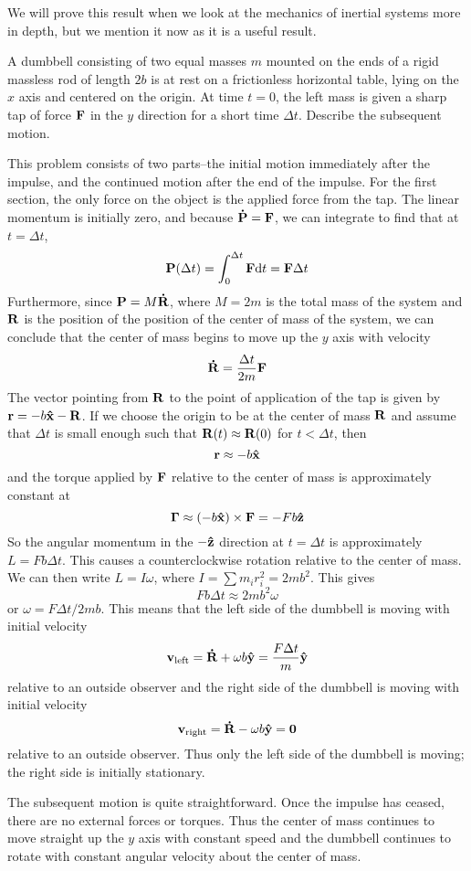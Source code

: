 We will prove this result when we look at the mechanics of inertial systems more in depth, but we mention it now as it is a useful result.
\begin{example}
    A dumbbell consisting of two equal masses $m$ mounted on the ends of a rigid massless rod of length $2b$ is at rest on a frictionless horizontal table, lying on the $x$ axis and centered on the origin. At time $t=0$, the left mass is given a sharp tap of force $\mathbf{F}$ in the $y$ direction for a short time $\Delta t$. Describe the subsequent motion.

    This problem consists of two parts--the initial motion immediately after the impulse, and the continued motion after the end of the impulse. For the first section, the only force on the object is the applied force from the tap. The linear momentum is initially zero, and because $\mathbf{\dot P} = \mathbf{F}$, we can integrate to find that at $t=\Delta t$,
    \[ \mathbf{P}(\Delta t) = \int_0^{\Delta t} \mathbf{F}\dd t = \mathbf{F}\Delta t \]
    Furthermore, since $\mathbf{P} = M\mathbf{\dot R}$, where $M=2m$ is the total mass of the system and $\mathbf{R}$ is the position of the position of the center of mass of the system, we can conclude that the center of mass begins to move up the $y$ axis with velocity
    \[ \mathbf{\dot R} = \frac{\Delta t}{2m}\mathbf{F}\]
    The vector pointing from $\mathbf{R}$ to the point of application of the tap is given by $\mathbf{r} = -b\mathbf{\hat{x}} - \mathbf{R}$. If we choose the origin to be at the center of mass $\mathbf{R}$ and assume that $\Delta t$ is small enough such that $\mathbf{R}(t) \approx \mathbf{R}(0)$ for $t < \Delta t$, then
    \[ \mathbf{r} \approx -b\mathbf{\hat{x}} \]
    and the torque applied by $\mathbf{F}$ relative to the center of mass is approximately constant at
    \[ \mathbf{\Gamma} \approx (-b\mathbf{\hat{x}}) \times \mathbf{F} = -Fb\mathbf{\hat{z}} \]
    So the angular momentum in the $-\mathbf{\hat{z}}$ direction at $t=\Delta t$ is approximately $L = Fb\Delta t$. This causes a counterclockwise rotation relative to the center of mass. We can then write $L = I\omega$, where $I = \sum m_i r_i^2 = 2mb^2$. This gives
    \[ Fb\Delta t \approx 2mb^2\omega\]
    or $\omega = F\Delta t/2mb$. This means that the left side of the dumbbell is moving with initial velocity
    \[ \mathbf{v}_\text{left} = \mathbf{\dot R} + \omega b\mathbf{\hat{y}} = \frac{F\Delta t}{m}\mathbf{\hat{y}}  \]
    relative to an outside observer and the right side of the dumbbell is moving with initial velocity
    \[ \mathbf{v}_\text{right} = \mathbf{\dot R} - \omega b\mathbf{\hat{y}} = \mathbf{0} \]
    relative to an outside observer. Thus only the left side of the dumbbell is moving; the right side is initially stationary.

    The subsequent motion is quite straightforward. Once the impulse has ceased, there are no external forces or torques. Thus the center of mass continues to move straight up the $y$ axis with constant speed and the dumbbell continues to rotate with constant angular velocity about the center of mass.
\end{example}